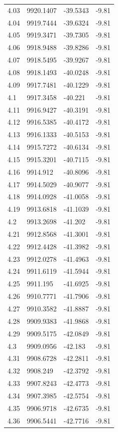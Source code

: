 \begin{table}[H]
\begin{tabular}{llll}
4.03 & 9920.1407 & -39.5343 & -9.81 \\
4.04 & 9919.7444 & -39.6324 & -9.81 \\
4.05 & 9919.3471 & -39.7305 & -9.81 \\
4.06 & 9918.9488 & -39.8286 & -9.81 \\
4.07 & 9918.5495 & -39.9267 & -9.81 \\
4.08 & 9918.1493 & -40.0248 & -9.81 \\
4.09 & 9917.7481 & -40.1229 & -9.81 \\
4.1 & 9917.3458 & -40.221 & -9.81 \\
4.11 & 9916.9427 & -40.3191 & -9.81 \\
4.12 & 9916.5385 & -40.4172 & -9.81 \\
4.13 & 9916.1333 & -40.5153 & -9.81 \\
4.14 & 9915.7272 & -40.6134 & -9.81 \\
4.15 & 9915.3201 & -40.7115 & -9.81 \\
4.16 & 9914.912 & -40.8096 & -9.81 \\
4.17 & 9914.5029 & -40.9077 & -9.81 \\
4.18 & 9914.0928 & -41.0058 & -9.81 \\
4.19 & 9913.6818 & -41.1039 & -9.81 \\
4.2 & 9913.2698 & -41.202 & -9.81 \\
4.21 & 9912.8568 & -41.3001 & -9.81 \\
4.22 & 9912.4428 & -41.3982 & -9.81 \\
4.23 & 9912.0278 & -41.4963 & -9.81 \\
4.24 & 9911.6119 & -41.5944 & -9.81 \\
4.25 & 9911.195 & -41.6925 & -9.81 \\
4.26 & 9910.7771 & -41.7906 & -9.81 \\
4.27 & 9910.3582 & -41.8887 & -9.81 \\
4.28 & 9909.9383 & -41.9868 & -9.81 \\
4.29 & 9909.5175 & -42.0849 & -9.81 \\
4.3 & 9909.0956 & -42.183 & -9.81 \\
4.31 & 9908.6728 & -42.2811 & -9.81 \\
4.32 & 9908.249 & -42.3792 & -9.81 \\
4.33 & 9907.8243 & -42.4773 & -9.81 \\
4.34 & 9907.3985 & -42.5754 & -9.81 \\
4.35 & 9906.9718 & -42.6735 & -9.81 \\
4.36 & 9906.5441 & -42.7716 & -9.81 \\

\end{tabular}
\end{table}

